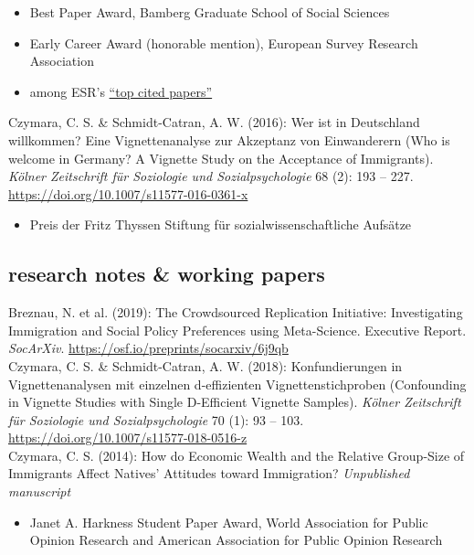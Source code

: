\documentclass[11pt, a4paper]{article}
\newcommand{\years}[1]{\marginnote{~~#1}}
\begin{document}
\begin{itemize}
	\item Best Paper Award, Bamberg Graduate School of Social Sciences
	\item Early Career Award (honorable mention), European Survey Research Association
	\item among ESR's \href{https://academic.oup.com/esr/pages/Top_Cited_Papers}{``top cited papers''}
\end{itemize}
\years{1}Czymara, C. S. \& Schmidt-Catran, A. W. (2016): Wer ist in Deutschland willkommen? Eine Vignettenanalyse zur Akzeptanz von Einwanderern (Who is welcome in Germany? A Vignette Study on the Acceptance of Immigrants). \textit{K\"olner Zeitschrift f\"ur Soziologie und Sozialpsychologie} 68 (2): 193 -- 227. \href{https://doi.org/10.1007/s11577-016-0361-x}{https://doi.org/10.1007/s11577-016-0361-x}
\begin{itemize}
	\item Preis der Fritz Thyssen Stiftung für sozialwissenschaftliche Aufsätze
\end{itemize}

\hspace{1em}
\subsection*{research notes \& working papers}
\years{3}Breznau, N. et al. (2019): The Crowdsourced Replication Initiative: Investigating Immigration and Social Policy Preferences using Meta-Science. Executive Report. \textit{SocArXiv}. \href{https://osf.io/preprints/socarxiv/6j9qb}{https://osf.io/preprints/socarxiv/6j9qb}\\[1em]
\years{2}Czymara, C. S. \& Schmidt-Catran, A. W. (2018): Konfundierungen in Vignettenanalysen mit einzelnen d-effizienten Vignettenstichproben (Confounding in Vignette Studies with Single D-Efficient Vignette Samples). \textit{K\"olner Zeitschrift f\"ur Soziologie und Sozialpsychologie} 70 (1): 93 -- 103. \href{https://doi.org/10.1007/s11577-018-0516-z}{https://doi.org/10.1007/s11577-018-0516-z}\\[1em]
\years{1}Czymara, C. S. (2014): How do Economic Wealth and the Relative Group-Size of Immigrants Affect Natives' Attitudes toward Immigration? \textit{Unpublished manuscript}
\begin{itemize}
	\item Janet A. Harkness Student Paper Award, World Association for Public Opinion Research and American Association for Public Opinion Research
\end{itemize}
\end{document}
